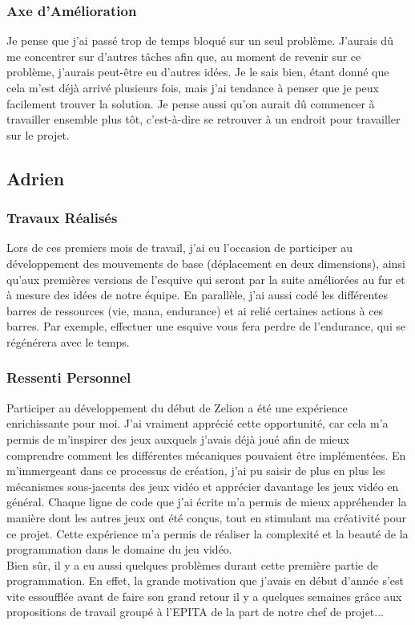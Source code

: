 \documentclass[a4page, 14pt]{extarticle}
\begin{document}
        \subsubsection{Axe d'Amélioration}
            {Je pense que j'ai passé trop de temps bloqué sur un seul problème. J'aurais dû me concentrer sur d'autres tâches afin que, au moment de revenir sur ce problème, j'aurais peut-être eu d'autres idées. Je le sais bien, étant donné que cela m'est déjà arrivé plusieurs fois, mais j'ai tendance à penser que je peux facilement trouver la solution.
    Je pense aussi qu'on aurait dû commencer à travailler ensemble plus tôt, c'est-à-dire se retrouver à un endroit pour travailler sur le projet.}
    \subsection{Adrien}
        \subsubsection{Travaux Réalisés}
    {Lors de ces premiers mois de travail, j'ai eu l'occasion de participer au développement des mouvements de base (déplacement en deux dimensions), ainsi qu'aux premières versions de l'esquive qui seront par la suite améliorées au fur et à mesure des idées de notre équipe. En parallèle, j'ai aussi codé les différentes barres de ressources (vie, mana, endurance) et ai relié certaines actions à ces barres. Par exemple, effectuer une esquive vous fera perdre de l'endurance, qui se régénérera avec le temps.}
\subsubsection{Ressenti Personnel}
    {Participer au développement du début de Zelion a été une expérience enrichissante pour moi. J'ai vraiment apprécié cette opportunité, car cela m'a permis de m'inspirer des jeux auxquels j'avais déjà joué afin de mieux comprendre comment les différentes mécaniques pouvaient être implémentées. En m'immergeant dans ce processus de création, j'ai pu saisir de plus en plus les mécanismes sous-jacents des jeux vidéo et apprécier davantage les jeux vidéo en général. Chaque ligne de code que j'ai écrite m'a permis de mieux appréhender la manière dont les autres jeux ont été conçus, tout en stimulant ma créativité pour ce projet. Cette expérience m'a permis de réaliser la complexité et la beauté de la programmation dans le domaine du jeu vidéo.
    \\ Bien sûr, il y a eu aussi quelques problèmes durant cette première partie de programmation. En effet, la grande motivation que j'avais en début d'année s'est vite essoufflée avant de faire son grand retour il y a quelques semaines grâce aux propositions de travail groupé à l'EPITA de la part de notre chef de projet...}
\end{document}
